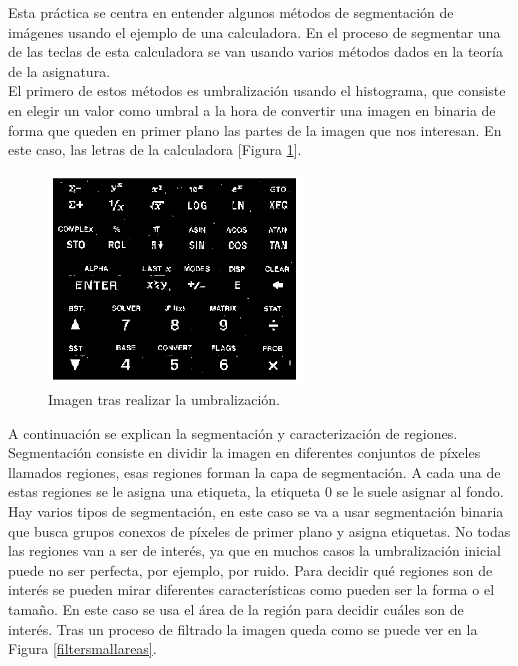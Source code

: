 \documentclass[a4paper,12pt]{report}
\begin{document}
Esta práctica se centra en entender algunos métodos de segmentación de imágenes usando el ejemplo de una calculadora. En el proceso de segmentar una de las teclas de esta calculadora se van usando varios métodos dados en la teoría de la asignatura.\\

El primero de estos métodos es umbralización usando el histograma, que consiste en elegir un valor como umbral a la hora de convertir una imagen en binaria de forma que queden en primer plano las partes de la imagen que nos interesan. En este caso, las letras de la calculadora [Figura \ref{thresholding}].\\

\begin{figure}[h]
\centering
\includegraphics[width=0.6\textwidth]{imagenes/thresholding}
\caption{Imagen tras realizar la umbralización.}
\label{thresholding}
\end{figure}
A continuación se explican la segmentación y caracterización de regiones. Segmentación consiste en dividir la imagen en diferentes conjuntos de píxeles llamados regiones, esas regiones forman la capa de segmentación. A cada una de estas regiones se le asigna una etiqueta, la etiqueta 0 se le suele asignar al fondo.\\

Hay varios tipos de segmentación, en este caso se va a usar segmentación binaria que busca grupos conexos de píxeles de primer plano y asigna etiquetas. No todas las regiones van a ser de interés, ya que en muchos casos la umbralización inicial puede no ser perfecta, por ejemplo, por ruido. Para decidir qué regiones son de interés se pueden mirar diferentes características como pueden ser la forma o el tamaño. En este caso se usa el área de la región para decidir cuáles son de interés. Tras un proceso de filtrado la imagen queda como se puede ver en la Figura \ref{filtersmallareas}.\\
\end{document}
